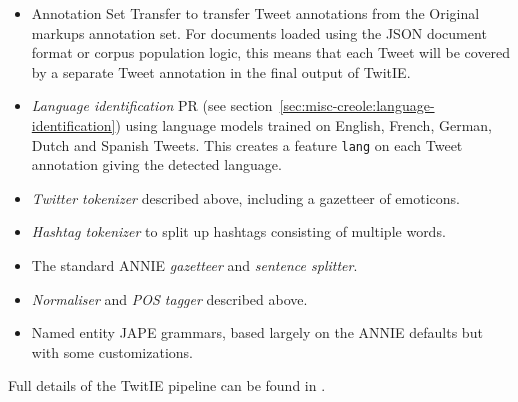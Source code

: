 \begin{itemize}
\item Annotation Set Transfer to transfer Tweet annotations from the Original
  markups annotation set.  For documents loaded using the JSON document format
  or corpus population logic, this means that each Tweet will be covered by a
  separate Tweet annotation in the final output of TwitIE.
\item \emph{Language identification} PR (see
  section~\ref{sec:misc-creole:language-identification}) using language models
  trained on English, French, German, Dutch and Spanish Tweets.  This creates a
  feature \verb!lang! on each Tweet annotation giving the detected language.
\item \emph{Twitter tokenizer} described above, including a gazetteer of
  emoticons.
\item \emph{Hashtag tokenizer} to split up hashtags consisting of multiple
  words.
\item The standard ANNIE \emph{gazetteer} and \emph{sentence splitter}.
\item \emph{Normaliser} and \emph{POS tagger} described above.
\item Named entity JAPE grammars, based largely on the ANNIE defaults but with
  some customizations.
\end{itemize}

Full details of the TwitIE pipeline can be found in \cite{bontcheva2013twitie}.

